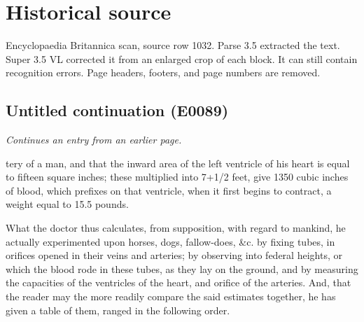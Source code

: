 \documentclass{article}
\begin{document}
\section*{Historical source}
Encyclopaedia Britannica scan, source row 1032. Parse 3.5 extracted the text. Super 3.5 VL corrected it from an enlarged crop of each block. It can still contain recognition errors.
Page headers, footers, and page numbers are removed.

\subsection*{Untitled continuation (E0089)}
\textit{Continues an entry from an earlier page.}

tery of a man, and that the inward area of the left ventricle of his heart is equal to fifteen square inches; these multiplied into 7+1/2 feet, give 1350 cubic inches of blood, which prefixes on that ventricle, when it first begins to contract, a weight equal to 15.5 pounds.

What the doctor thus calculates, from supposition, with regard to mankind, he actually experimented upon horses, dogs, fallow-does, \&c. by fixing tubes, in orifices opened in their veins and arteries; by observing into federal heights, or which the blood rode in these tubes, as they lay on the ground, and by measuring the capacities of the ventricles of the heart, and orifice of the arteries. And, that the reader may the more readily compare the said estimates together, he has given a table of them, ranged in the following order.
\end{document}
